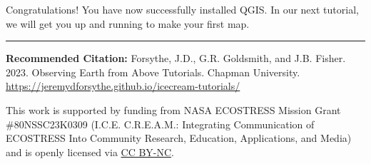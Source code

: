 \documentclass[oneside,a4paper,11pt,explicit]{book}
\begin{document}
\vspace{1em}

Congratulations! You have now successfully installed QGIS. In our next tutorial, we will get you up and running to make your first map.

\clearpage


\hrule

\vspace{1em}

\small \textbf{Recommended Citation:} Forsythe, J.D., G.R. Goldsmith, and J.B. Fisher. 2023. Observing Earth from Above Tutorials. Chapman University. \url{https://jeremydforsythe.github.io/icecream-tutorials/}

\vspace{1em}

This work is supported by funding from NASA ECOSTRESS Mission Grant \#80NSSC23K0309 (I.C.E. C.R.E.A.M.: Integrating Communication of ECOSTRESS Into Community Research, Education, Applications, and Media) and is openly licensed via \href{https://creativecommons.org/licenses/by-nc/4.0/}{CC BY-NC}.
\end{document}
